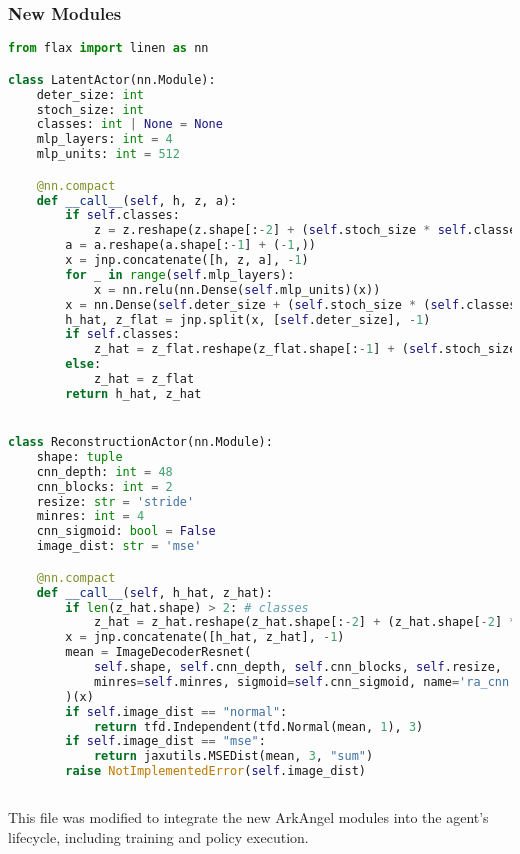 \documentclass[11pt]{article}
\newcommand{\code}[1]{\texttt{\detokenize{#1}}}
\begin{document}
\subsubsection{New Modules}
\begin{lstlisting}[language=Python]
from flax import linen as nn

class LatentActor(nn.Module):
    deter_size: int
    stoch_size: int
    classes: int | None = None
    mlp_layers: int = 4
    mlp_units: int = 512

    @nn.compact
    def __call__(self, h, z, a):
        if self.classes:
            z = z.reshape(z.shape[:-2] + (self.stoch_size * self.classes,))
        a = a.reshape(a.shape[:-1] + (-1,))
        x = jnp.concatenate([h, z, a], -1)
        for _ in range(self.mlp_layers):
            x = nn.relu(nn.Dense(self.mlp_units)(x))
        x = nn.Dense(self.deter_size + (self.stoch_size * (self.classes or 1)))(x)
        h_hat, z_flat = jnp.split(x, [self.deter_size], -1)
        if self.classes:
            z_hat = z_flat.reshape(z_flat.shape[:-1] + (self.stoch_size, self.classes))
        else:
            z_hat = z_flat
        return h_hat, z_hat


class ReconstructionActor(nn.Module):
    shape: tuple
    cnn_depth: int = 48
    cnn_blocks: int = 2
    resize: str = 'stride'
    minres: int = 4
    cnn_sigmoid: bool = False
    image_dist: str = 'mse'

    @nn.compact
    def __call__(self, h_hat, z_hat):
        if len(z_hat.shape) > 2: # classes
            z_hat = z_hat.reshape(z_hat.shape[:-2] + (z_hat.shape[-2] * z_hat.shape[-1],))
        x = jnp.concatenate([h_hat, z_hat], -1)
        mean = ImageDecoderResnet(
            self.shape, self.cnn_depth, self.cnn_blocks, self.resize, 
            minres=self.minres, sigmoid=self.cnn_sigmoid, name='ra_cnn'
        )(x)
        if self.image_dist == "normal":
            return tfd.Independent(tfd.Normal(mean, 1), 3)
        if self.image_dist == "mse":
            return jaxutils.MSEDist(mean, 3, "sum")
        raise NotImplementedError(self.image_dist)
\end{lstlisting}

\subsection{\code{dreamerv3/agent.py}}
This file was modified to integrate the new ArkAngel modules into the agent's lifecycle, including training and policy execution.
\end{document}
